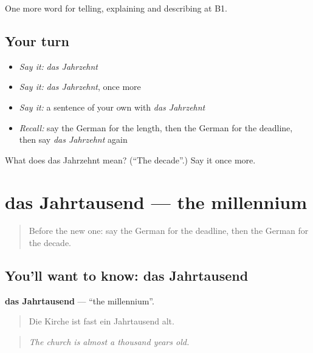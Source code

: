 \begin{grammarlens}[title={What you've built}]
One more word for telling, explaining and describing at B1.
\end{grammarlens}

\subsection*{Your turn}
\begin{itemize}
\raggedright
  \item \emph{Say it:} \emph{das Jahrzehnt}
  \item \emph{Say it:} \emph{das Jahrzehnt}, once more
  \item \emph{Say it:} a sentence of your own with \emph{das Jahrzehnt}
  \item \emph{Recall:} say the German for the length, then the German for the deadline, then say \emph{das Jahrzehnt} again
\end{itemize}

\begin{tcolorbox}[breakable,colback=teal!4,colframe=teal!35!black,title={Before you move on}]
What does das Jahrzehnt mean? (\textquotedblleft{}The decade\textquotedblright{}.) Say it once more.
\end{tcolorbox}
\section[das Jahrtausend]{das Jahrtausend — the millennium}

\label{lesson:GE-C269-jahrtausend}



\begin{quote}
Before the new one: say the German for the deadline, then the German for the decade.
\end{quote}

\subsection*{You'll want to know: das Jahrtausend}
\textbf{das Jahrtausend} — \textquotedblleft{}the millennium\textquotedblright{}.

\begin{quote}
Die Kirche ist fast ein Jahrtausend alt.
\end{quote}

\begin{quote}
\emph{The church is almost a thousand years old.}
\end{quote}

